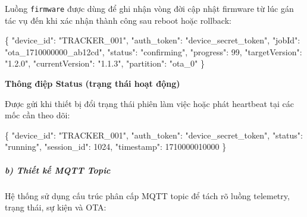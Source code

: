 \documentclass[13pt,a4paper]{extarticle}
\newenvironment{Shaded}{}{}
\newcommand{\DataTypeTok}[1]{\textcolor[rgb]{0.56,0.13,0.00}{#1}}
\newcommand{\DecValTok}[1]{\textcolor[rgb]{0.25,0.63,0.44}{#1}}
\newcommand{\FunctionTok}[1]{\textcolor[rgb]{0.02,0.16,0.49}{#1}}
\newcommand{\StringTok}[1]{\textcolor[rgb]{0.25,0.44,0.63}{#1}}
\renewcommand{\\}{\thesislongtableorignewline\hline}%
\begin{document}
Luồng \texttt{firmware} được dùng để ghi nhận vòng đời cập nhật firmware
từ lúc gán tác vụ đến khi xác nhận thành công sau reboot hoặc rollback:

\begin{Shaded}
\begin{Highlighting}[]
\FunctionTok{\{}
  \DataTypeTok{"device\_id"}\FunctionTok{:} \StringTok{"TRACKER\_001"}\FunctionTok{,}
  \DataTypeTok{"auth\_token"}\FunctionTok{:} \StringTok{"device\_secret\_token"}\FunctionTok{,}
  \DataTypeTok{"jobId"}\FunctionTok{:} \StringTok{"ota\_1710000000\_ab12cd"}\FunctionTok{,}
  \DataTypeTok{"status"}\FunctionTok{:} \StringTok{"confirming"}\FunctionTok{,}
  \DataTypeTok{"progress"}\FunctionTok{:} \DecValTok{99}\FunctionTok{,}
  \DataTypeTok{"targetVersion"}\FunctionTok{:} \StringTok{"1.2.0"}\FunctionTok{,}
  \DataTypeTok{"currentVersion"}\FunctionTok{:} \StringTok{"1.1.3"}\FunctionTok{,}
  \DataTypeTok{"partition"}\FunctionTok{:} \StringTok{"ota\_0"}
\FunctionTok{\}}
\end{Highlighting}
\end{Shaded}

\textbf{Thông điệp Status (trạng thái hoạt động)}

Được gửi khi thiết bị đổi trạng thái phiên làm việc hoặc phát heartbeat
tại các mốc cần theo dõi:

\begin{Shaded}
\begin{Highlighting}[]
\FunctionTok{\{}
  \DataTypeTok{"device\_id"}\FunctionTok{:} \StringTok{"TRACKER\_001"}\FunctionTok{,}
  \DataTypeTok{"auth\_token"}\FunctionTok{:} \StringTok{"device\_secret\_token"}\FunctionTok{,}
  \DataTypeTok{"status"}\FunctionTok{:} \StringTok{"running"}\FunctionTok{,}
  \DataTypeTok{"session\_id"}\FunctionTok{:} \DecValTok{1024}\FunctionTok{,}
  \DataTypeTok{"timestamp"}\FunctionTok{:} \DecValTok{1710000010000}
\FunctionTok{\}}
\end{Highlighting}
\end{Shaded}

\subparagraph{b) Thiết kế MQTT
Topic}\label{b-thiux1ebft-kux1ebf-mqtt-topic}

Hệ thống sử dụng cấu trúc phân cấp MQTT topic để tách rõ luồng
telemetry, trạng thái, sự kiện và OTA:
\end{document}
